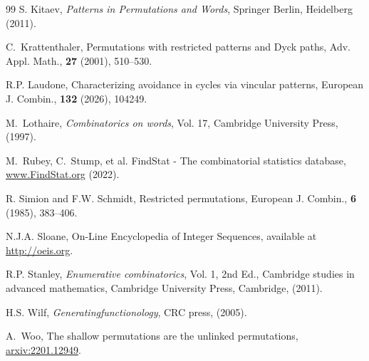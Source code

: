 \documentclass[12pt]{amsart}
\numberwithin{equation}{section}
\theoremstyle{plain}
\begin{document}
\begin{thebibliography}{99}
		 S. Kitaev, {\it Patterns in Permutations and Words}, Springer Berlin, Heidelberg (2011).

		 C.~Krattenthaler, Permutations with restricted patterns and Dyck paths, Adv. Appl. Math., {\bf27} (2001), 510--530.

		 R.P. Laudone, Characterizing avoidance in cycles via vincular patterns, European J. Combin., {\bf132} (2026), 104249.

		 M.~Lothaire, {\it Combinatorics on words}, Vol. 17, Cambridge University Press, (1997).

		 M.~Rubey, C.~Stump, et al. FindStat - The combinatorial statistics database, \url{www.FindStat.org} (2022).

		 R. Simion and F.W. Schmidt, Restricted permutations, European J. Combin., {\bf6} (1985), 383--406.

		 N.J.A. Sloane, On-Line Encyclopedia of Integer Sequences, available at \url{http://oeis.org}.
	
		 R.P. Stanley, {\em Enumerative combinatorics}, Vol. 1, 2nd Ed., Cambridge studies in advanced mathematics, Cambridge University Press, Cambridge, (2011).

		 H.S. Wilf, {\em Generatingfunctionology}, CRC press, (2005).

		 A.~Woo, The shallow permutations are the unlinked permutations, 
		\href{https://arxiv.org/abs/2201.12949}{arxiv:2201.12949}.
		
	\end{thebibliography}
\end{document}

